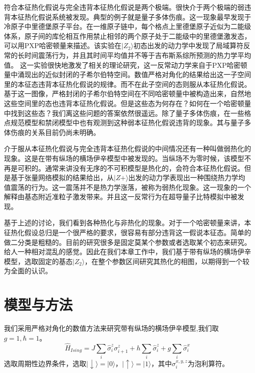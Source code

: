 符合本征热化假说与完全违背本征热化假说是两个极端。很快介于两个极端的弱违背本征热化假说系统被发现。典型的例子就是量子多体伤痕。这一现象最早发现于冷原子中里德堡原子平台\cite{bernien2017probing}。在一维原子链中，每个格点上里德堡原子近似为二能级体系，原子间的库伦相互作用禁止相邻的两个原子处于二能级中的里德堡激发态，可以用PXP哈密顿量来描述。该实验在$|Z_2\rangle$初态出发的动力学中发现了局域算符反常的长时间震荡行为，并且其时间平均值并不等于吉布斯系综所预测的热力学平均值。
这一实验很快地激发了相关的理论研究\cite{turner2018weak,Turner2018quantum,Ho2019periodic,Choi2019emergent,Michailidis2020slow,serbyn2021quantum,Yao2022quantum}，这一反常动力学来自于PXP哈密顿量中涌现出的近似封闭的子希尔伯特空间。数值严格对角化的结果给出这一子空间里的本征态违背本征热化假说的规律。而不在此子空间的态则服从本征热化假说。基于这一图像，严格封闭的子希尔伯特空间在不同哈密顿量中被构造出来\cite{Shiraishi2017Systematic,Moudgalya2018exact,Moudgalya2018entanglement,Khemani2020lacalization,Moudgalya2020eta,Lin2019Exact,Schecter2019weak,Mark2020unified,Mark2020eta,Pakrouski2020many,Ren2021quasi,ODea2020from}，自然地这些空间里的态也违背本征热化假说。但是这些态为何存在？如何在一个哈密顿量中找到这些态？我们离这些问题的答案依然很遥远。除了量子多体伤痕，在一些格点规范模型\cite{magnifico2020real,Chanda2020confinement,Borla2020confined}和禁闭模型\cite{Nandkishore2017many,kormos2017real,Robinson2019signature,Yang2020Hilbert,Castro2020entanglement}中也有观测到这种弱本征热化假说违背的现象。其与量子多体伤痕的关系目前仍尚未明确\cite{serbyn2021quantum}。


介于服从本征热化假说与完全违背本征热化假说的中间情况还有一种叫做弱热化的现象\cite{banuls2011strong}。这是在带有纵场的横场伊辛模型中被发现的。当纵场不为零时候，该模型不再是可积的。通常来讲没有无序的不可积模型是热化的，会符合本征热化假说。但是基于张量网络模拟的结果给出，从$|Z+\rangle$出发的动力学表现出一种围绕热力学均值震荡的行为。这一震荡并不是热力学涨落，被称为弱热化现象。这一现象的一个解释由基态附近准粒子激发带来\cite{Lin2017quasiparticle}。并且这一反常行为在超导量子比特模拟中被发现\cite{Chen2021observation}。

基于上述的讨论，我们看到各种热化与非热化的现象。对于一个哈密顿量来讲，本征热化假设总归是一个很严格的要求，很容易有部分违背这一假说本征态。简单的做二分类是粗糙的。目前的研究很多是固定莫某个参数或者选取某个初态来研究。给人一种相对混乱的感觉。因此在我们本章工作中，我们基于带有纵场的横场伊辛模型，选取固定的基态$|Z_2\rangle$，在整个参数区间研究其热化的相图，以期得到一个较为全面的认识。

\section{模型与方法}
我们采用严格对角化的数值方法来研究带有纵场的横场伊辛模型,我们取$g=1,\hbar=1$。
\begin{equation}
\hat{H}_{Ising} = J\sum_{i}\hat{\sigma}^z_i\sigma^z_{i+1} + h\sum_{i}\hat{\sigma}^z_i + g\sum_i\hat{\sigma}^x_i
\label{Ising}
\end{equation}
选取周期性边界条件，选取$|\downarrow\rangle=|0\rangle$，$|\uparrow\rangle=|1\rangle$，其中$\sigma_i^{x,y,z}$为泡利算符。

